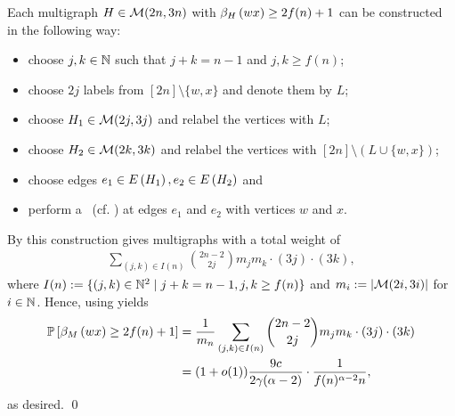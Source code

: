 Each multigraph $H \in \mathcal{M}(2n,3n)$ with $\beta_{H}\left(wx\right)\geq2f(n)+1$ can be constructed in the following way:
\begin{itemize}
	\item
	choose $j,k \in \mathbb{N}$ such that $j+k=n-1$ and $j,k\geq f(n)$;
	\item
	choose $2j$ labels from $[2n]\setminus \{w,x\}$ and denote them by $L$;
	\item
	choose $H_1\in \mathcal{M}(2j,3j)$ and relabel the vertices with $L$;
	\item
	choose $H_2\in \mathcal{M}(2k,3k)$ and relabel the vertices with $[2n]\setminus \left(L\cup\{w,x\}\right)$;
	\item
	choose edges $e_1 \in E\left(H_1\right), e_2 \in E\left(H_2\right)$ and 
	\item[]
	 perform a \bridgeInsertion\ (cf. ) at edges $e_1$ and $e_2$ with vertices $w$ and $x$.
\end{itemize}
By  this construction gives multigraphs with a total weight of
\begin{align}\label{CBeq:construction_bridge}
\sum_{(j,k)\in I(n)}\binom{2n-2}{2j}m_jm_k\cdot (3j) \cdot (3k),
\end{align}
where $I(n):=\{(j,k)\in \mathbb{N}^2 \mid j+k=n-1, j,k \geq f(n) \}$ and $m_i:=\left|\mathcal{M}(2i,3i)\right|$ for $i\in \mathbb{N}$. Hence, using  yields
\begin{align*}
\mathbb{P}\left[\beta_{M}\left(wx\right)\geq 2f(n)+1\right]
&=\frac{1}{m_n}\sum_{(j,k)\in I(n)}\binom{2n-2}{2j}m_jm_k \cdot (3j) \cdot (3k)
\\
&=(1+o(1))\frac{9c}{2\gamma(\alpha-2)}\cdot\frac{1}{f(n)^{\alpha-2}n},
\end{align*}
as desired. \qed
 
